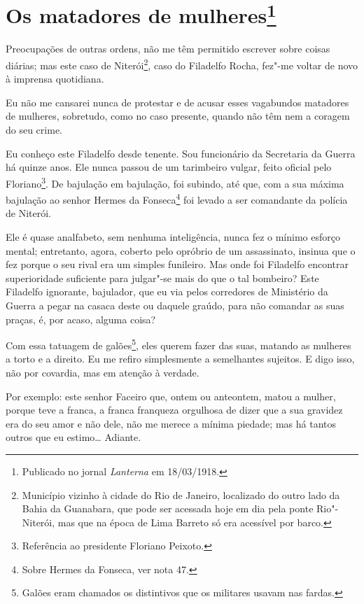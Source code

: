 \chapter[Os matadores de mulheres]{Os matadores de mulheres\footnote[*]{Publicado no jornal \emph{Lanterna} em 18/03/1918.}}

Preocupações de outras ordens, não me têm permitido escrever sobre
coisas diárias; mas este caso de Niterói\footnote{Município vizinho à
  cidade do Rio de Janeiro, localizado do outro lado da Bahia da
  Guanabara, que pode ser acessada hoje em dia pela ponte Rio"-Niterói,
  mas que na época de Lima Barreto só era acessível por barco.}, caso do
Filadelfo Rocha, fez"-me voltar de novo à imprensa quotidiana.

Eu não me cansarei nunca de protestar e de acusar esses vagabundos
matadores de mulheres, sobretudo, como no caso presente, quando não têm
nem a coragem do seu crime.

Eu conheço este Filadelfo desde tenente. Sou funcionário da Secretaria
da Guerra há quinze anos. Ele nunca passou de um tarimbeiro vulgar,
feito oficial pelo Floriano\footnote{Referência ao presidente Floriano
  Peixoto.}. De bajulação em bajulação, foi subindo, até que, com a sua
máxima bajulação ao senhor Hermes da Fonseca\footnote{Sobre Hermes da
  Fonseca, ver nota 47.} foi levado a ser comandante da polícia de
Niterói.

Ele é quase analfabeto, sem nenhuma inteligência, nunca fez o mínimo
esforço mental; entretanto, agora, coberto pelo opróbrio de um
assassinato, insinua que o fez porque o seu rival era um simples
funileiro. Mas onde foi Filadelfo encontrar superioridade suficiente
para julgar"-se mais do que o tal bombeiro? Este Filadelfo ignorante,
bajulador, que eu via pelos corredores de Ministério da Guerra a pegar
na casaca deste ou daquele graúdo, para não comandar as suas praças, é,
por acaso, alguma coisa?

Com essa tatuagem de galões\footnote{Galões eram chamados os distintivos
  que os militares usavam nas fardas.}, eles querem fazer das suas,
matando as mulheres a torto e a direito. Eu me refiro simplesmente a
semelhantes sujeitos. E digo isso, não por covardia, mas em atenção à
verdade.

Por exemplo: este senhor Faceiro que, ontem ou anteontem, matou a
mulher, porque teve a franca, a franca franqueza orgulhosa de dizer que
a sua gravidez era do seu amor e não dele, não me merece a mínima
piedade; mas há tantos outros que eu estimo\ldots{} Adiante.

